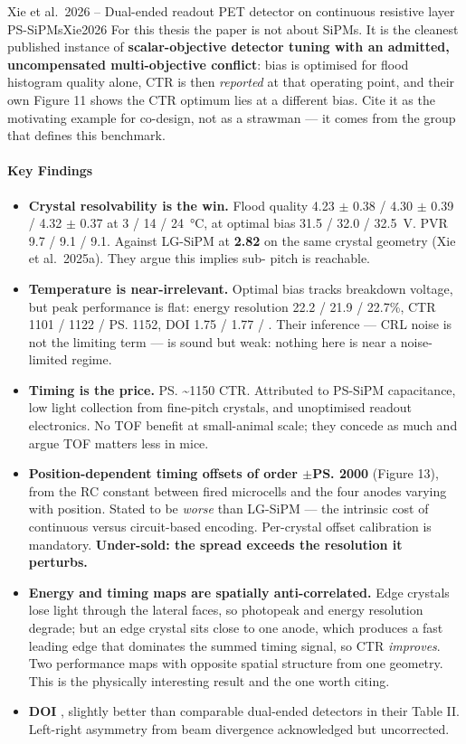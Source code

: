 \begin{papernote}{Xie et al.\ 2026 -- Dual-ended readout PET detector on continuous resistive layer PS-SiPMs}{Xie2026}
For this thesis the paper is not about SiPMs. It is the cleanest published
instance of \textbf{scalar-objective detector tuning with an admitted,
uncompensated multi-objective conflict}: bias is optimised for flood histogram
quality alone, CTR is then \emph{reported} at that operating point, and their own
Figure 11 shows the CTR optimum lies at a different bias. Cite it as the
motivating example for co-design, not as a strawman --- it comes from the group
that defines this benchmark.
 
\paragraph{Key Findings}
\begin{itemize}
	\item \textbf{Crystal resolvability is the win.} Flood quality
		4.23 $\pm$ 0.38 / 4.30 $\pm$ 0.39 / 4.32 $\pm$ 0.37 at 3 / 14 /
		\qty{24}{\degreeCelsius}, at optimal bias 31.5 / 32.0 /
		\qty{32.5}{\volt}. PVR 9.7 / 9.1 / 9.1. Against LG-SiPM at
		\textbf{2.82} on the same crystal geometry (Xie et al.\ 2025a). They
		argue this implies sub- pitch is reachable.
	\item \textbf{Temperature is near-irrelevant.} Optimal bias tracks
		breakdown voltage, but peak performance is flat: energy resolution
		22.2 / 21.9 / 22.7\%, CTR 1101 / 1122 / \ps{1152}, DOI
		1.75 / 1.77 / . Their inference --- CRL noise is not the
		limiting term --- is sound but weak: nothing here is near a
		noise-limited regime.
	\item \textbf{Timing is the price.} \ps{\sim1150} CTR. Attributed to
		PS-SiPM capacitance, low light collection from fine-pitch crystals, and
		unoptimised readout electronics. No TOF benefit at small-animal scale;
		they concede as much and argue TOF matters less in mice.
	\item \textbf{Position-dependent timing offsets of order
		$\pm$\ps{2000}} (Figure 13), from the RC constant between fired
		microcells and the four anodes varying with position. Stated to be
		\emph{worse} than LG-SiPM --- the intrinsic cost of continuous versus
		circuit-based encoding. Per-crystal offset calibration is mandatory.
		\textbf{Under-sold: the spread exceeds the resolution it perturbs.}
	\item \textbf{Energy and timing maps are spatially anti-correlated.}
		Edge crystals lose light through the lateral faces, so photopeak and
		energy resolution degrade; but an edge crystal sits close to one anode,
		which produces a fast leading edge that dominates the summed timing
		signal, so CTR \emph{improves}. Two performance maps with opposite
		spatial structure from one geometry. This is the physically interesting
		result and the one worth citing.
	\item \textbf{DOI }, slightly better than comparable
		dual-ended detectors in their Table II. Left-right asymmetry from beam
		divergence acknowledged but uncorrected.
\end{itemize}
 

\end{papernote}
